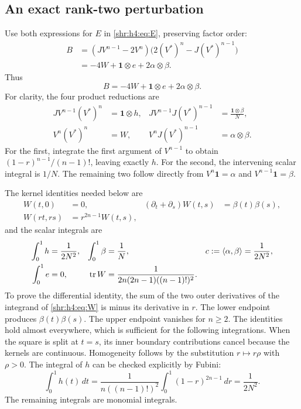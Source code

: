 \documentclass[11pt,letterpaper]{article}
\numberwithin{equation}{section}
\theoremstyle{definition}
\newcommand{\1}{\mathbf 1}
\newcommand{\one}{\mathbf1}
\newcommand{\ip}[2]{\langle #1,#2\rangle}
\DeclareMathOperator{\tr}{tr}
\newcommand{\dd}{\,d}
\begin{document}
\subsection{An exact rank-two perturbation}
Use both expressions for $E$ in \eqref{shr:h4:eq:E}, preserving factor order:
\begin{align*}
 B&=(JV^{n-1}-2V^n)
       \bigl(2(V^*)^n-J(V^*)^{n-1}\bigr)\\
  &=-4W+\one\otimes e+2\alpha\otimes\beta.
\end{align*}
Thus
\begin{equation}
 B=-4W+\one\otimes e+2\alpha\otimes\beta.
 \label{shr:h4:eq:ranktwo}
\end{equation}
For clarity, the four product reductions are
\begin{align*}
 JV^{n-1}(V^*)^n&=\one\otimes h,&
 JV^{n-1}J(V^*)^{n-1}&=\frac{\one\otimes\beta}N,\\
 V^n(V^*)^n&=W,&
 V^nJ(V^*)^{n-1}&=\alpha\otimes\beta.
\end{align*}
For the first, integrate the first argument of $V^{n-1}$ to obtain
$(1-r)^{n-1}/(n-1)!$, leaving exactly $h$. For the second, the intervening
scalar integral is $1/N$. The remaining two follow directly from
$V^n\one=\alpha$ and $V^{n-1}\one=\beta$.

The kernel identities needed below are
\begin{align}
 W(t,0)&=0,& (\partial_t+\partial_s)W(t,s)&=\beta(t)\beta(s),
 \label{shr:h4:eq:Wdiff}\\
 W(rt,rs)&=r^{2n-1}W(t,s),
 \label{shr:h4:eq:Whom}
\end{align}
and the scalar integrals are
\begin{align}
 \int_0^1h&=\frac1{2N^2},&
 \int_0^1\beta&=\frac1N,&
 c:=\ip\alpha\beta&=\frac1{2N^2},\notag\\
 \int_0^1e&=0,&
 \tr W&=\frac1{2n(2n-1)((n-1)!)^2}.
 \label{shr:h4:eq:elementary}
\end{align}
To prove the differential identity, the sum of the two outer derivatives
of the integrand of \eqref{shr:h4:eq:W} is minus its derivative in $r$. The lower
endpoint produces $\beta(t)\beta(s)$. The upper endpoint vanishes for
$n\ge2$. The identities hold almost everywhere, which is sufficient for
the following integrations. When the square is split at $t=s$, its inner
boundary contributions cancel because the kernels are continuous.
Homogeneity follows by the substitution $r\mapsto r\rho$ with
$\rho>0$. The integral of $h$ can be checked explicitly by Fubini:
\[
 \int_0^1h(t)\dd t
 =\frac1{n((n-1)!)^2}\int_0^1(1-r)^{2n-1}\dd r
 =\frac1{2N^2}.
\]
The remaining integrals are monomial integrals.
\end{document}
